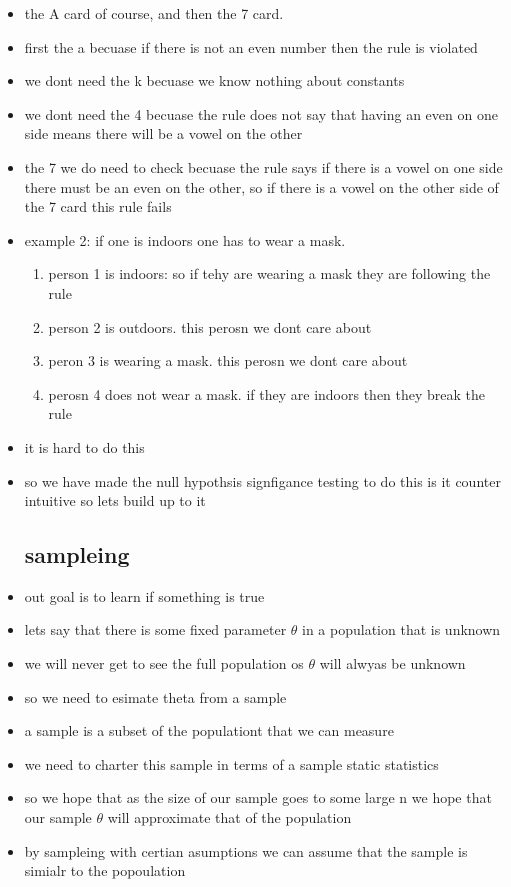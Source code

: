 \documentclass{article}
\begin{document}
\begin{itemize}
\item the A card of course, and then the 7 card.
\item first the a becuase if there is not an even number then the rule is violated 
\item we dont need the k becuase we know nothing about constants 
\item we dont need the 4 becuase the rule does not say that having an even on one side means there will be a vowel on the other
\item the 7 we do need to check becuase the rule says if there is a vowel on one side there must be an even on the other, so if there is a vowel on the other side of the 7 card this rule fails
\item example 2: if one is indoors one has to wear a mask. 
\begin{enumerate}
    \item person 1 is indoors: so if tehy are wearing a mask they are following the rule 
    \item person 2 is outdoors. this perosn we dont care about
    \item peron 3 is wearing a mask. this perosn we dont care about
    \item perosn 4 does not wear a mask. if they are indoors then they break the rule 
\end{enumerate}
\item it is hard to do this 
\item so we have made the null hypothsis signfigance testing to do this 
\itme is it counter intuitive so lets build up to it 
\subsection{sampleing }
\item out goal is to learn if something is true 
\item lets say that there is some fixed parameter $\theta$ in a population that is unknown
\item we will never get to see the full population os $\theta$ will alwyas be unknown 
\item so we need to esimate theta from a sample 
\item a sample is a subset of the populationt that we can measure 
\item we need to charter this sample in terms of a sample static statistics
\item so we hope that as the size of our sample goes to some large n we hope that our sample $\theta$ will approximate that of the population 
\item by sampleing with certian asumptions we can assume that the sample is simialr to the popoulation 

\end{itemize}
\end{document}
